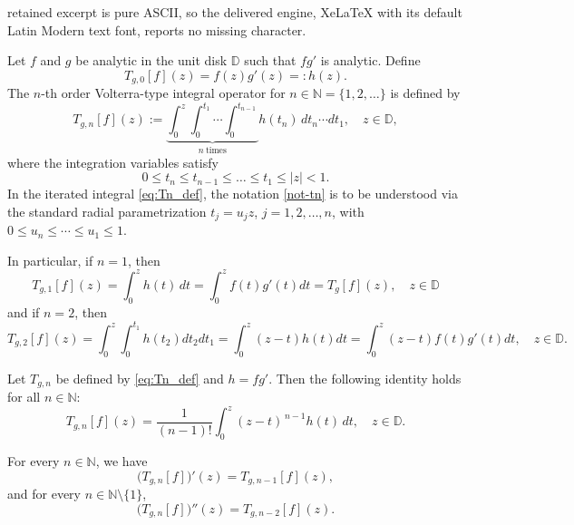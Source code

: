 \documentclass[10pt,a4paper]{amsart}
\begin{document}
retained excerpt is pure ASCII, so the delivered engine, XeLaTeX with its default Latin Modern text font, reports no missing character.
\begin{definition}\rm
Let $f$ and $g$ be analytic in the unit disk $\mathbb{D}$ such that $fg'$ is analytic.  
Define
\begin{equation*}
T_{g,0}[f](z)=f(z)g'(z)=:h(z).
\end{equation*}
The $n$-th order Volterra-type integral operator for $n\in\mathbb{N}=\{1,2,\ldots\}$ is defined by
\begin{equation}\label{eq:Tn_def}
T_{g,n}[f](z)
:=\underbrace{\int_0^z\int_0^{t_1}\cdots\int_0^{t_{n-1}}}_{n\ \text{times}} h(t_n)\,dt_n\cdots dt_1,
\quad z\in\mathbb{D},
\end{equation}
where the integration variables satisfy
\begin{equation}\label{not-tn}
0 \le t_n \le t_{n-1} \le \dots \le t_1 \le |z| < 1.
\end{equation}
In the iterated integral \eqref{eq:Tn_def}, the notation \eqref{not-tn} is to be understood via the standard radial parametrization \(t_j=u_j z\), $j=1,2,\ldots,n$, with \(0\le u_n\le\cdots\le u_1\le1\). 

In particular, if $n=1$, then
\begin{equation*}
  T_{g,1}[f](z)=\int_0^z h(t)\,dt=\int_0^z f(t)g'(t)dt=T_g [f](z),\quad z\in \mathbb D
\end{equation*}
and if $n=2$, then
\begin{equation*}
  T_{g,2}[f](z)=\int_0^z\int_0^{t_1} h(t_2) dt_2 dt_1
  =\int_0^z (z-t)h(t)dt=\int_0^z (z-t)f(t)g'(t)dt,\quad z\in \mathbb D.
\end{equation*}
\end{definition}

\begin{proposition}\label{prop:iterated-convolution}
Let $T_{g,n}$ be defined by \eqref{eq:Tn_def} and $h=fg'$. Then the following identity holds for all $n\in\mathbb N$:
\begin{equation*}\label{eq:iterated-to-convolution}
T_{g,n}[f](z)=\frac{1}{(n-1)!}\int_{0}^{z}(z-t)^{\,n-1}h(t)\,dt,\quad z\in\mathbb{D}.
\end{equation*}
\end{proposition}

\begin{proposition}\label{prop:Tn_derivatives}
 For every $n\in\mathbb{N}$, we have
\begin{equation*}
\big(T_{g,n}[f]\big)'(z)=T_{g,n-1}[f](z),
\end{equation*}
and for every $n\in\mathbb{N}\setminus\{1\}$,
\begin{equation*}
\big(T_{g,n}[f]\big)''(z)=T_{g,n-2}[f](z).
\end{equation*}
\end{proposition}
\end{document}
